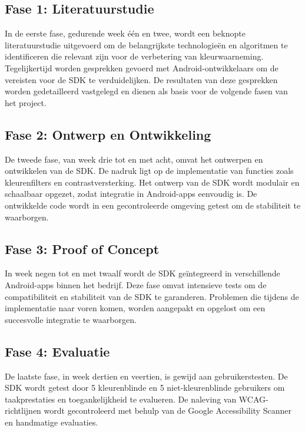 \subsection{Fase 1: Literatuurstudie}
In de eerste fase, gedurende week één en twee, wordt een beknopte literatuurstudie uitgevoerd om de 
belangrijkste technologieën en algoritmen te identificeren die relevant zijn voor de verbetering 
van kleurwaarneming. Tegelijkertijd worden gesprekken gevoerd met Android-ontwikkelaars om de 
vereisten voor de SDK te verduidelijken. De resultaten van deze gesprekken worden gedetailleerd 
vastgelegd en dienen als basis voor de volgende fasen van het project.
\subsection{Fase 2: Ontwerp en Ontwikkeling}
De tweede fase, van week drie tot en met acht, omvat het ontwerpen en ontwikkelen van de SDK. 
De nadruk ligt op de implementatie van functies zoals kleurenfilters en contrastversterking. 
Het ontwerp van de SDK wordt modulair en schaalbaar opgezet, zodat integratie in Android-apps 
eenvoudig is. De ontwikkelde code wordt in een gecontroleerde omgeving getest om de stabiliteit 
te waarborgen.
\subsection{Fase 3: Proof of Concept}
In week negen tot en met twaalf wordt de SDK geïntegreerd in verschillende Android-apps 
binnen het bedrijf. Deze fase omvat intensieve tests om de compatibiliteit en stabiliteit van 
de SDK te garanderen. Problemen die tijdens de implementatie naar voren komen, worden aangepakt 
en opgelost om een succesvolle integratie te waarborgen.
\subsection{Fase 4: Evaluatie}
De laatste fase, in week dertien en veertien, is gewijd aan gebruikerstesten. 
De SDK wordt getest door 5 kleurenblinde en 5 niet-kleurenblinde gebruikers om taakprestaties 
en toegankelijkheid te evalueren. De naleving van WCAG-richtlijnen wordt gecontroleerd met behulp 
van de Google Accessibility Scanner en handmatige evaluaties.
